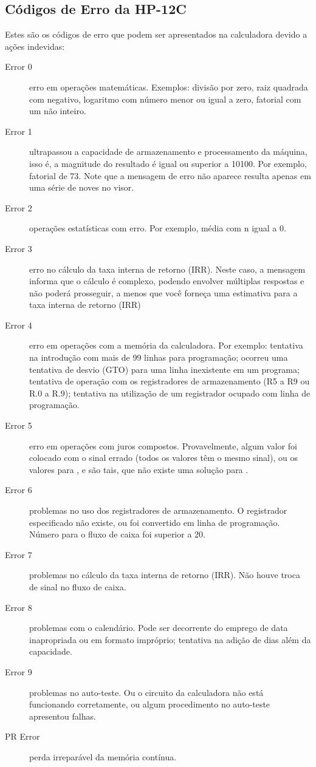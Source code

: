 \subsection*{Códigos de Erro da HP-12C}
Estes são os códigos de erro que podem ser apresentados na calculadora devido a ações indevidas:
\begin{description}
	\item[Error 0] erro em operações matemáticas. Exemplos: divisão por zero, raiz quadrada com negativo, logaritmo com número menor ou igual a zero, fatorial com um não inteiro.
	\item[Error 1] ultrapassou a capacidade de armazenamento e processamento da máquina, isso é, a magnitude do resultado é igual ou superior a 10100. Por exemplo, fatorial de 73. Note que a mensagem de erro não aparece resulta apenas em uma série de noves no visor.
	\item[Error 2] operações estatísticas com erro. Por exemplo, média com n igual a 0.
	\item[Error 3] erro no cálculo da taxa interna de retorno (IRR). Neste caso, a mensagem informa que o cálculo é complexo, podendo envolver múltiplas respostas e não poderá prosseguir, a menos que você forneça uma estimativa para a taxa interna de retorno (IRR)
	\item[Error 4] erro em operações com a memória da calculadora. Por exemplo: tentativa na introdução com mais de 99 linhas para programação; ocorreu uma tentativa de desvio (GTO) para uma linha inexistente em um programa; tentativa de operação com os registradores de armazenamento (R5 a R9 ou R.0 a R.9); tentativa na utilização de um registrador ocupado com linha de programação.
	\item[Error 5] erro em operações com juros compostos. Provavelmente, algum valor foi colocado com o sinal errado (todos os valores têm o mesmo sinal), ou os valores para ,  e  são tais, que não existe uma solução para .
	\item[Error 6] problemas no uso dos registradores de armazenamento. O registrador especificado não existe, ou foi convertido em linha de programação. Número para o fluxo de caixa foi superior a 20.
	\item[Error 7] problemas no cálculo da taxa interna de retorno (IRR). Não houve troca de sinal no fluxo de caixa.
	\item[Error 8] problemas com o calendário. Pode ser decorrente do emprego de data inapropriada ou em formato impróprio; tentativa na adição de dias além da capacidade.
	\item[Error 9] problemas no auto-teste. Ou o circuito da calculadora não está funcionando corretamente, ou algum procedimento no auto-teste apresentou falhas.
	\item[PR Error] perda irreparável da memória contínua.
\end{description}

